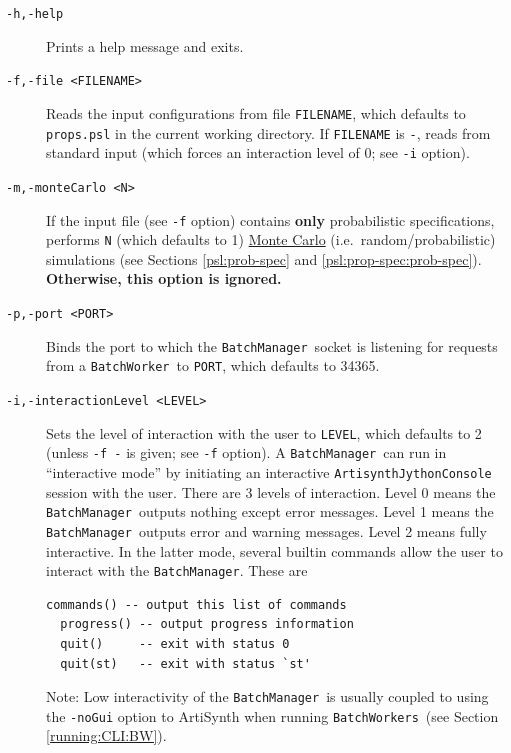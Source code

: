 \documentclass{article}
\newcommand{\BM}{{\tt BatchManager}}
\newcommand{\BW}{{\tt BatchWorker}}
\newcommand{\BWs}{{\tt BatchWorkers}}
\begin{document}
\begin{description}

\item[{\tt -h,-help} ] \mbox{}

Prints a help message and exits.

\item[{\tt -f,-file <FILENAME>} ] \mbox{}

Reads the input configurations from file {\tt FILENAME}, which defaults to {\tt props.psl} in the current working directory. If {\tt FILENAME} is {\tt -}, reads from standard input (which forces an interaction level of 0; see {\tt -i} option).

\item[{\tt -m,-monteCarlo <N>} ] \mbox{}

If the input file (see {\tt -f} option) contains \textbf{only} probabilistic specifications, performs {\tt N} (which defaults to 1) \href{https://en.wikipedia.org/wiki/Monte_Carlo_method}{Monte Carlo} (i.e.\ random/probabilistic) simulations (see Sections \ref{psl:prob-spec} and \ref{psl:prop-spec:prob-spec}). \textbf{Otherwise, this option is ignored.}

\item[{\tt -p,-port <PORT>} ] \mbox{}

Binds the port to which the \BM\ socket is listening for requests from a \BW\ to {\tt PORT}, which defaults to 34365.

\item[{\tt -i,-interactionLevel <LEVEL>} ] \mbox{}

Sets the level of interaction with the user to {\tt LEVEL}, which defaults to 2 (unless {\tt -f -} is given; see {\tt -f} option). A \BM\ can run in ``interactive mode'' by initiating an interactive {\tt ArtisynthJythonConsole} session with the user. There are 3 levels of interaction. Level 0 means the \BM\ outputs nothing except error messages. Level 1 means the \BM\ outputs error and warning messages. Level 2 means fully interactive. In the latter mode, several builtin commands allow the user to interact with the \BM. These are

\begin{lstlisting}[]
  commands() -- output this list of commands
  progress() -- output progress information
  quit()     -- exit with status 0
  quit(st)   -- exit with status `st'
\end{lstlisting}

\begin{sideblock}
Note:  Low interactivity of the \BM\ is usually coupled to using the {\tt -noGui} option to ArtiSynth when running \BWs\ (see Section \ref{running:CLI:BW}).
\end{sideblock}


\end{description}
\end{document}

